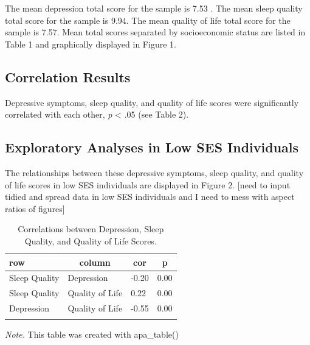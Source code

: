 \documentclass[man]{apa6}
\theoremstyle{definition}
\theoremstyle{definition}
\theoremstyle{definition}
\theoremstyle{remark}
\begin{document}
The mean depression total score for the sample is 7.53 . The mean sleep
quality total score for the sample is 9.94. The mean quality of life
total score for the sample is 7.57. Mean total scores separated by
socioeconomic status are listed in Table 1 and graphically displayed in
Figure 1.

\subsection{Correlation Results}\label{correlation-results}

Depressive symptoms, sleep quality, and quality of life scores were
significantly correlated with each other, \emph{p} \textless{} .05 (see
Table 2).

\subsection{Exploratory Analyses in Low SES
Individuals}\label{exploratory-analyses-in-low-ses-individuals}

The relationships between these depressive symptoms, sleep quality, and
quality of life scores in low SES individuals are displayed in Figure 2.
{[}need to input tidied and spread data in low SES individuals and I
need to mess with aspect ratios of figures{]}

\begin{table}[tbp]
\begin{center}
\begin{threeparttable}
\caption{\label{tab:correlations table}Correlations between Depression, Sleep Quality, and Quality of Life Scores.}
\begin{tabular}{llll}
\toprule
row & \multicolumn{1}{c}{column} & \multicolumn{1}{c}{cor} & \multicolumn{1}{c}{p}\\
\midrule
Sleep Quality & Depression & -0.20 & 0.00\\
Sleep Quality & Quality of Life & 0.22 & 0.00\\
Depression & Quality of Life & -0.55 & 0.00\\
\bottomrule
\addlinespace
\end{tabular}
\begin{tablenotes}[para]
\normalsize{\textit{Note.} This table was created with apa\_table()}
\end{tablenotes}
\end{threeparttable}
\end{center}
\end{table}
\end{document}
